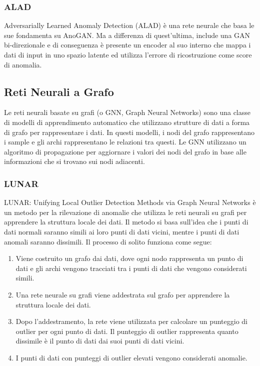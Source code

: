\subsubsection{ALAD}
Adversarially Learned Anomaly Detection (ALAD) \cite{zenati2018adversarially} è una rete neurale che basa le sue fondamenta su AnoGAN. Ma a differenza di quest'ultima, include una GAN bi-direzionale e di conseguenza è presente un encoder al suo interno che mappa i dati di input in uno spazio latente ed utilizza l'errore di ricostruzione come score di anomalia.

\subsection{Reti Neurali a Grafo}
Le reti neurali basate su grafi (o GNN, Graph Neural Networks) sono una classe di modelli di apprendimento automatico che utilizzano strutture di dati a forma di grafo per rappresentare i dati. In questi modelli, i nodi del grafo rappresentano i sample e gli archi rappresentano le relazioni tra questi. Le GNN utilizzano un algoritmo di propagazione per aggiornare i valori dei nodi del grafo in base alle informazioni che si trovano sui nodi adiacenti.

\subsubsection{LUNAR}
LUNAR: Unifying Local Outlier Detection Methods via Graph Neural Networks \cite{goodge2022lunar} è un metodo per la rilevazione di anomalie che utilizza le reti neurali su grafi per apprendere la struttura locale dei dati. Il metodo si basa sull'idea che i punti di dati normali saranno simili ai loro punti di dati vicini, mentre i punti di dati anomali saranno dissimili.
Il processo di solito funziona come segue:
\begin{enumerate}
\item Viene costruito un grafo dai dati, dove ogni nodo rappresenta un punto di dati e gli archi vengono tracciati tra i punti di dati che vengono considerati simili.
\item Una rete neurale su grafi viene addestrata sul grafo per apprendere la struttura locale dei dati.
\item Dopo l'addestramento, la rete viene utilizzata per calcolare un punteggio di outlier per ogni punto di dati. Il punteggio di outlier rappresenta quanto dissimile è il punto di dati dai suoi punti di dati vicini.
\item I punti di dati con punteggi di outlier elevati vengono considerati anomalie.

\end{enumerate}

